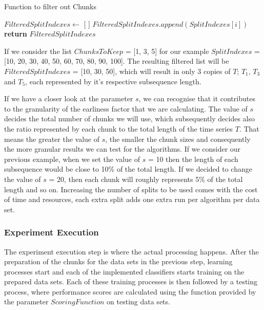 \begin{algorithm}
    \caption{Function to filter out Chunks}\label{FunctionChunksToKeep}
    \begin{algorithmic}[1]
      \State $FilteredSplitIndexes \gets$ [ ]
                \State $FilteredSplitIndexes.append(SplitIndexes[i])$
        \EndFor
        \State \textbf{return} $FilteredSplitIndexes$
      \EndFunction
    \end{algorithmic}
\end{algorithm}

If we consider the list $ChunksToKeep$ = [1, 3, 5] for our example $SplitIndexes$ = [10, 20, 30, 40, 50, 60, 70, 80, 90, 100].
The resulting filtered list will be $FilteredSplitIndexes$ = [10, 30, 50], which will result in only 3 copies of $T$; $T_{1}$, $T_{3}$ and $T_{5}$,
each represented by it's respective subsequence length.

If we have a closer look at the parameter $s$, we can recognise that it contributes to the granularity of the earliness factor that we are calculating.
The value of $s$ decides the total number of chunks we will use, which subsequently decides also the ratio represented by each chunk to the total length of the time series $T$.
That means the greater the value of $s$, the smaller the chunk sizes and consequently the more granular results we can test for the algorithms.
If we consider our previous example, when we set the value of $s$ = 10 then the length of each subsequence would be close to 10\% of the total length.
If we decided to change the value of $s$ = 20, then each chunk will roughly represents 5\% of the total length and so on.
Increasing the number of splits to be used comes with the cost of time and resources, each extra split adds one extra run per algorithm per data set.

\subsubsection{Experiment Execution}
\label{SubsectionExperimentExecution}
The experiment execution step is where the actual processing happens.
After the preparation of the chunks for the data sets in the previous step, learning processes start and each of the implemented classifiers starts training on the prepared data sets.
Each of these training processes is then followed by a testing process, where performance scores are calculated using the function provided by the parameter $ScoringFunction$ on testing data sets.

